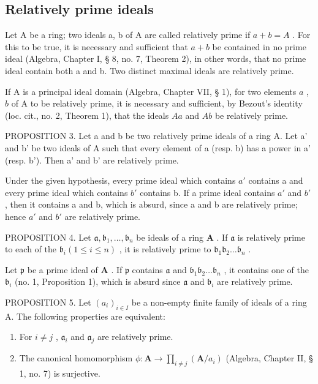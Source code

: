 \subsection{Relatively prime ideals}

Let A be a ring; two ideals a, b of A are called relatively prime if \(a + b = A\) . For this to be true, it is necessary and sufficient that \(a + b\) be contained in no prime ideal (Algebra, Chapter I, § 8, no. 7, Theorem 2), in other words, that no prime ideal contain both a and b. Two distinct maximal ideals are relatively prime.

If A is a principal ideal domain (Algebra, Chapter VII, § 1), for two elements \(a\) , \(b\) of A to be relatively prime, it is necessary and sufficient, by Bezout's identity (loc. cit., no. 2, Theorem 1), that the ideals \(Aa\) and \(Ab\) be relatively prime.

PROPOSITION 3. Let a and b be two relatively prime ideals of a ring A. Let a' and b' be two ideals of A such that every element of a (resp. b) has a power in a' (resp. b'). Then a' and b' are relatively prime.

Under the given hypothesis, every prime ideal which contains \(a'\) contains a and every prime ideal which contains \(b'\) contains b. If a prime ideal contains \(a'\) and \(b'\) , then it contains a and b, which is absurd, since a and b are relatively prime; hence \(a'\) and \(b'\) are relatively prime.

PROPOSITION 4. Let \(\mathfrak{a}, \mathfrak{b}_1, \ldots, \mathfrak{b}_n\) be ideals of a ring \(\mathbf{A}\) . If \(\mathfrak{a}\) is relatively prime to each of the \(\mathfrak{b}_i (1 \leqslant i \leqslant n)\) , it is relatively prime to \(\mathfrak{b}_1\mathfrak{b}_2 \ldots \mathfrak{b}_n\) .

Let \(\mathfrak{p}\) be a prime ideal of \(\mathbf{A}\) . If \(\mathfrak{p}\) contains \(\mathfrak{a}\) and \(\mathfrak{b}_1\mathfrak{b}_2\ldots \mathfrak{b}_n\) , it contains one of the \(\mathfrak{b}_i\) (no. 1, Proposition 1), which is absurd since \(\mathfrak{a}\) and \(\mathfrak{b}_i\) are relatively prime.

PROPOSITION 5. Let \((a_{i})_{i\in I}\) be a non-empty finite family of ideals of a ring A. The following properties are equivalent:

\begin{enumerate}
\def\labelenumi{(\alph{enumi})}
\item
  For \(i \neq j\) , \(\mathfrak{a}_i\) and \(\mathfrak{a}_j\) are relatively prime.
\item
  The canonical homomorphism \(\phi: \mathbf{A} \to \prod_{i \neq j} (\mathbf{A} / a_i)\) (Algebra, Chapter II, § 1, no. 7) is surjective.
\end{enumerate}

